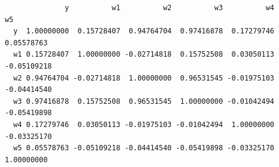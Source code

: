 \documentclass[12pt,twoside]{reedthesis}
\begin{document}
  \begin{Shaded}
  \begin{Highlighting}[]
  \StringTok{ }\NormalTok{(}\NormalTok{)}
  
  \StringTok{ }\NormalTok{*}\NormalTok{(}\StringTok{ }\NormalTok{(}\NormalTok{)}
  
  \StringTok{ }\StringTok{ }\StringTok{ }\NormalTok{(}\NormalTok{)}
  
  \StringTok{ }\NormalTok{(}\NormalTok{)}
  
  \StringTok{ }\NormalTok{*}\NormalTok{(}\StringTok{ }\NormalTok{(}\NormalTok{)}
  
  \StringTok{ }\StringTok{ }\StringTok{ } \NormalTok{*}\StringTok{ }\StringTok{ }\StringTok{ }\StringTok{ }\NormalTok{(}\NormalTok{)}
  
  \StringTok{ }
  
  \end{Highlighting}
  \end{Shaded}
  
  \begin{verbatim}
              y          w1          w2          w3          w4          w5
  y  1.00000000  0.15728407  0.94764704  0.97416878  0.17279746  0.05578763
  w1 0.15728407  1.00000000 -0.02714818  0.15752508  0.03050113 -0.05109218
  w2 0.94764704 -0.02714818  1.00000000  0.96531545 -0.01975103 -0.04414540
  w3 0.97416878  0.15752508  0.96531545  1.00000000 -0.01042494 -0.05419898
  w4 0.17279746  0.03050113 -0.01975103 -0.01042494  1.00000000 -0.03325170
  w5 0.05578763 -0.05109218 -0.04414540 -0.05419898 -0.03325170  1.00000000
  \end{verbatim}
  
  \begin{Shaded}
  \begin{Highlighting}[]
  \end{Highlighting}
  \end{Shaded}
  
\end{document}
